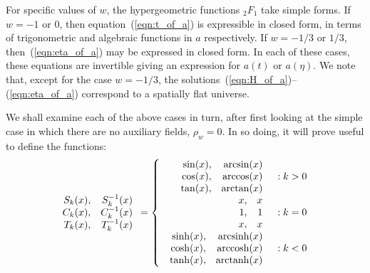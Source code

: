 For specific values of $w$, the hypergeometric functions $_2F_1$ take simple forms. If $w=-1$ or $0$, then equation~(\ref{eqn:t_of_a}) is expressible in closed form, in terms of trigonometric and algebraic functions in $a$ respectively. If $w=-1/3$ or $1/3$, then~(\ref{eqn:eta_of_a}) may be expressed in closed form. In each of these cases, these equations are invertible giving an expression for $a(t)$ or $a(\eta)$.  We note that, except for the case $w=-1/3$, the solutions~(\ref{eqn:H_of_a})--(\ref{eqn:eta_of_a}) correspond to a spatially flat universe.

We shall examine each of the above cases in turn, after first looking at the simple case in which there are no auxiliary fields, $\rho_w=0$.  In so doing, it will prove useful to define the functions:
%
\begin{equation}
  \begin{array}{rr}
    S_k(x),&S_k^{-1}(x)
    \\ 
    C_k(x),&C_k^{-1}(x)
    \\ 
    T_k(x),&T_k^{-1}(x)
    \\
  \end{array}
  =
  \left\{
%
  \begin{array}{rl}
%
    \begin{array}{rr}
      \sin(x),&\arcsin(x)
      \\ 
      \cos(x),&\arccos(x)
      \\ 
      \tan(x),&\arctan(x)
      \\
    \end{array}
%
    &: k>0 \\
%
    \begin{array}{rr}
      x,&x
      \\ 
      1,&1
      \\ 
      x,&x
      \\
    \end{array}
%
    &: k=0 \\
%
    \begin{array}{rr}
      \sinh(x),&\arcsinh(x)
      \\ 
      \cosh(x),&\arccosh(x)
      \\ 
      \tanh(x),&\arctanh(x)
      \\
    \end{array}
%
    &: k<0
  \end{array}
%
  \right. 
\end{equation}
%

